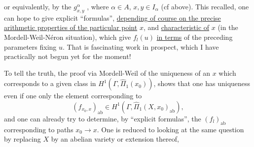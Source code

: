 or equivalently, by the $g^\alpha_{x,y}$ \inserted{$\in\widehat\Pi_\alpha$}, where $\alpha\in A$, $x,y\in I_\alpha$ (cf above). This recalled,
one can hope to give explicit ``formulas'', \uline{depending of course on the precise arithmetic properties of the particular point} $x$, and \uline{characteristic of} $x$ (in the Mordell-Weil-Néron situation), which give $f_l(u)$ \uline{in terms} of the preceding parameters fixing $u$. That is fascinating work in prospect, which I have practically not begun yet for the moment!

To tell the truth, the proof via Mordell-Weil of the uniqueness of an $x$  which corresponds to a given class in $H^1(\Gamma,\widehat\Pi_1(x_0))$, shows that one has uniqueness even if one   only the element corresponding to 
\[
\tag{34}(f_{x_0,x})_{\mathrm{ab}}\in H^1(\Gamma,\widehat\Pi_1(X,x_0)_{\mathrm{ab}}),
\]
and one can already try to determine, by ``explicit formulas'', the $(f_l)_{\mathrm{ab}}$ corresponding to paths $x_0\longrightarrow x$. One is reduced to looking at the same question by replacing $X$ by an abelian variety or extension thereof,

